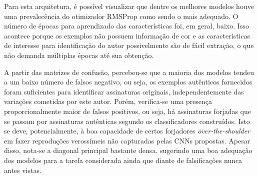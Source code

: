 
Para esta arquitetura, é possível visualizar que dentre os melhores modelos houve uma prevalecência do otimizador RMSProp como sendo o mais adequado. O número de épocas para aprendizado das características foi, em geral, baixo. Isso acontece porque os exemplos não possuem informação de cor e as características de interesse para identificação do autor possivelmente são de fácil extração, o que não demanda múltiplas épocas até sua obtenção.

A partir das matrizes de confusão, percebeu-se que a  maioria dos modelos tendeu a um baixo número de falsos negativo, ou seja, os exemplos autênticos fornecidos foram suficientes para identificar assinaturas originais, independentemente das variações cometidas por este autor. Porém, verifica-se uma presença proporcionalmente maior de falsos positivos, ou seja,  há assinaturas forjadas que se passam por assinaturas autênticas segundo os classificadores construídos. Isto se deve, potencialmente, à boa capacidade de certos forjadores \emph{over-the-shoulder} em fazer reproduções verossímeis não capturadas pelas CNNs propostas. Apesar disso, nota-se a diagonal principal bastante densa, sugerindo uma boa adequação dos modelos para a tarefa considerada ainda que diante de falsificações nunca antes vistas.
